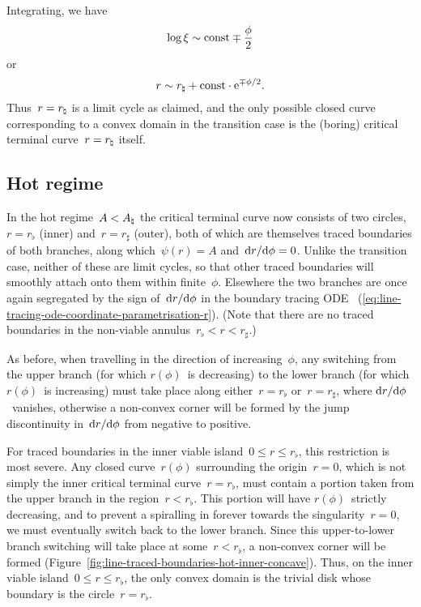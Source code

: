 Integrating, we have
\begin{equation}
  \log \xi \sim \mathrm{const} \mp \frac{\phi}{2}
  \label{eq:line-traced-boundary-transition-log-xi-near-r-natural}
\end{equation}
or
\begin{equation}
  r \sim r_\natural + \mathrm{const} \cdot \mathrm{e}^{\mp \phi / 2}.
  \label{eq:line-traced-boundary-transition-r-near-r-natural}
\end{equation}
Thus~$r = r_\natural$ is a limit cycle as claimed,
and the only possible closed curve corresponding to a convex domain
in the transition case
is the (boring) critical terminal curve~$r = r_\natural$ itself.

\subsection{Hot regime}
\label{sec:polar.tracing.hot}

In the hot regime~$A < A_\natural$
the critical terminal curve now consists of two circles,
$r = r_\flat$ (inner) and~$r = r_\sharp$ (outer),
both of which are themselves traced boundaries of both branches,
along which~$\psi (r) = A$ and~$\mathop{}\!\mathrm{d} r / {\mathop{}\!\mathrm{d}\phi} = 0$.
Unlike the transition case,
neither of these are limit cycles,
so that other traced boundaries will smoothly attach onto them
within finite~$\phi$.
Elsewhere the two branches are once again segregated
by the sign of~$\mathop{}\!\mathrm{d} r / {\mathop{}\!\mathrm{d}\phi}$ in the boundary tracing ODE~%
  (\ref{eq:line-tracing-ode-coordinate-parametrisation-r}).
(Note that there are no traced boundaries
in the non-viable annulus~$r_\flat < r < r_\sharp$.)

As before, when travelling in the direction of increasing~$\phi$,
any switching from the upper branch (for which $r (\phi)$~is decreasing)
to the lower branch (for which $r (\phi)$~is increasing)
must take place along either~$r = r_\flat$ or~$r = r_\sharp$,
where $\mathop{}\!\mathrm{d} r / {\mathop{}\!\mathrm{d}\phi}$~vanishes,
otherwise a non-convex corner will be formed
by the jump discontinuity in~$\mathop{}\!\mathrm{d} r / {\mathop{}\!\mathrm{d}\phi}$
from negative to positive.

\begin{figure}
\end{figure}

For traced boundaries in the inner viable island~$0 \le r \le r_\flat$,
this restriction is most severe.
Any closed curve~$r (\phi)$ surrounding the origin~$r = 0$,
which is not simply the inner critical terminal curve~$r = r_\flat$,
must contain a portion taken from the upper branch
in the region~$r < r_\flat$.
This portion will have $r (\phi)$~strictly decreasing,
and to prevent a spiralling in forever
towards the singularity~$r = 0$,
we must eventually switch back to the lower branch.
Since this upper-to-lower branch switching
will take place at some~$r < r_\flat$,
a non-convex corner will be formed
(Figure~\ref{fig:line-traced-boundaries-hot-inner-concave}).
Thus, on the inner viable island~$0 \le r \le r_\flat$,
the only convex domain is the trivial disk
whose boundary is the circle~$r = r_\flat$.

